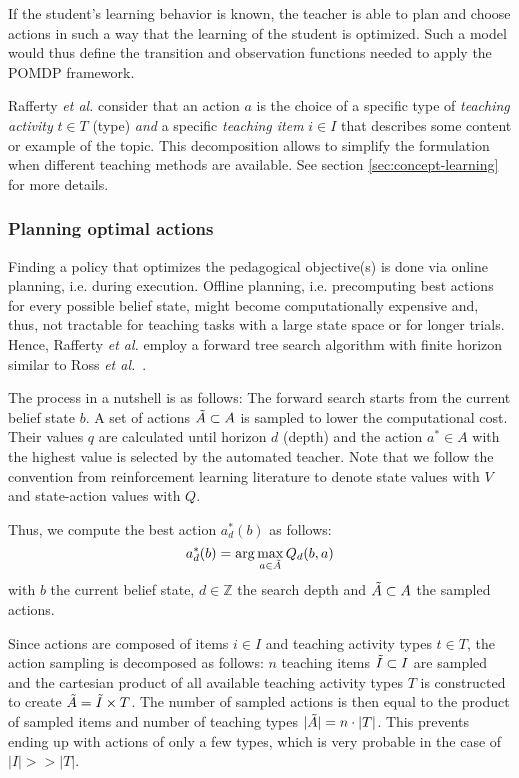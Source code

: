 If the student's learning behavior is known, the teacher is able to plan and choose actions in such a way that the learning of the student is optimized. 
Such a model would thus define the transition and observation functions needed to apply the POMDP framework.


Rafferty \textit{et al.} consider that an action $a$ is the choice of a specific type of \textit{teaching activity} $t \in T$ (type) \textit{and} a specific \textit{teaching item} $i \in I$ that describes some content or example of the topic.
This decomposition allows to simplify the formulation when different teaching methods are available.
See section \ref{sec:concept-learning} for more details.

\subsubsection{Planning optimal actions}

Finding a policy that optimizes the pedagogical objective(s) is done via online planning, i.e. during execution. Offline planning, i.e. precomputing best actions for every possible belief state, might become computationally expensive and, thus, not tractable for teaching tasks with a large state space or for longer trials. 
Hence, Rafferty \textit{et al.} employ a forward tree search algorithm with finite horizon similar to Ross \textit{et al.}~\cite{rossPomdp2008}.

The process in a nutshell is as follows:
The forward search starts from the current belief state $b$. 
A set of actions $\Tilde{A} \subset A$ is sampled to lower the computational cost.
Their values $q$ are calculated until horizon $d$ (depth) and the action $a^* \in A$ with the highest value is selected by the automated teacher.
Note that we follow the convention from reinforcement learning literature to denote state values with $V$ and state-action values with $Q$.

Thus, we compute the best action $a^*_d(b)$ as follows:
\begin{equation}
    a^*_d(b) = \arg \max_{a \in \Tilde{A}} Q_d(b, a)
    \label{eq:best-action}
\end{equation}
with $b$ the current belief state, $d \in \mathbb{Z}$ the search depth and $\Tilde{A} \subset A$ the sampled actions.

Since actions are composed of items $i \in I$ and teaching activity types $t \in T$, the action sampling is decomposed as follows:
$n$ teaching items $\Tilde{I} \subset I$ are sampled and the cartesian product of all available teaching activity types $T$ is constructed to create $\Tilde{A} = \Tilde{I} \times T$.
The number of sampled actions is then equal to the product of sampled items and number of teaching types $|\Tilde{A}| = n \cdot |T|$.
This prevents ending up with actions of only a few types, which is very probable in the case of $|I| >> |T|$.


